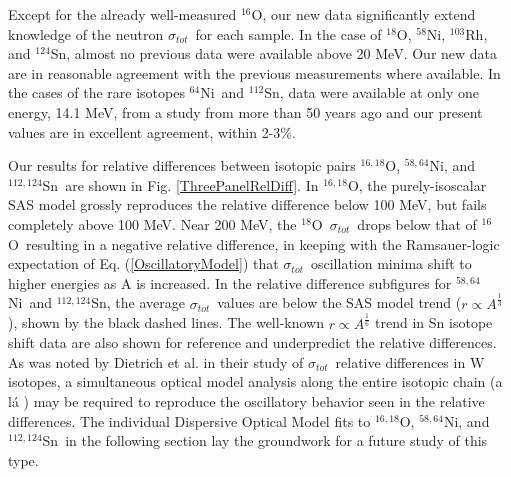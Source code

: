 \documentclass[twocolumn,secnumarabic,amssymb, nobibnotes, aps, prl,
superscriptaddress, nobalancelastpage]{revtex4}
\newcommand{\tot}{\ensuremath{\sigma_{tot}}}
\newcommand{\oSix}{\ensuremath{^{16}}O}
\newcommand{\oEight}{\ensuremath{^{18}}O}
\newcommand{\oSixEight}{\ensuremath{^{16,18}}O}
\newcommand{\niEight}{\ensuremath{^{58}}N\lowercase{i}}
\newcommand{\niFour}{\ensuremath{^{64}}N\lowercase{i}}
\newcommand{\niEightFour}{\ensuremath{^{58,64}}N\lowercase{i}}
\newcommand{\rhThree}{\ensuremath{^{103}}R\lowercase{h}}
\newcommand{\snTwelve}{\ensuremath{^{112}}S\lowercase{n}}
\newcommand{\snFour}{\ensuremath{^{124}}S\lowercase{n}}
\newcommand{\snTwelveFour}{\ensuremath{^{112,124}}S\lowercase{n}}
\begin{document}
Except for the already well-measured \oSix, our new data significantly
extend knowledge of the neutron \tot\ for each sample. In the case of \oEight,
\niEight, \rhThree, and \snFour, almost no previous data were available
above 20 MeV. Our new data are in reasonable agreement with the previous
measurements where available. In the cases of the rare isotopes \niFour\ and \snTwelve,
data were available at only one energy, 14.1 MeV, from a study from more than 50
years ago \cite{Dukarevich1967} and our present values are in excellent agreement, within 2-3\%.

Our results for relative differences between isotopic pairs \oSixEight,
\niEightFour, and \snTwelveFour\ are shown in Fig. \ref{ThreePanelRelDiff}. In
\oSixEight, the purely-isoscalar SAS model grossly reproduces the relative
difference below 100 MeV, but fails completely above 100 MeV. Near 200
MeV, the \oEight\ \tot\ drops below that of \oSix\ resulting in a negative
relative difference, in keeping with the Ramsauer-logic expectation of Eq.
(\ref{OscillatoryModel}) that \tot\ oscillation minima shift to higher
energies as A is increased. In the relative difference subfigures for 
\niEightFour\ and \snTwelveFour, the average \tot\ values are below the
SAS model trend ($r \propto A^{\frac{1}{3}}$), shown by the black dashed lines. 
The well-known $r \propto A^{\frac{1}{6}}$ trend in Sn isotope shift data 
\cite{Anselment1986} are also shown for reference and
underpredict the relative differences. As was noted by Dietrich et al. in
their study of \tot\ relative differences in W isotopes, a simultaneous optical
model analysis along the entire isotopic chain (a l\'a \cite{Mueller2011})
may be required to reproduce the oscillatory behavior seen in the relative differences.
The individual Dispersive Optical Model fits to \oSixEight, \niEightFour, and
\snTwelveFour\ in the following section lay the groundwork for a future study of
this type.
\end{document}
